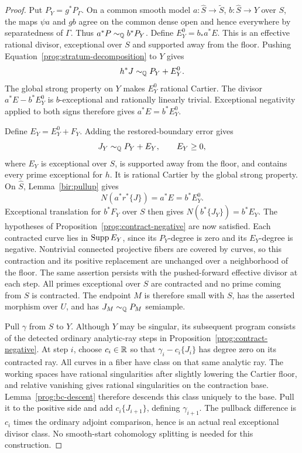 \begin{proof}
Put \(P_Y=g^*P_\Gamma\). On a common smooth model
\(a:\widehat S\to\widetilde S\), \(b:\widehat S\to Y\) over \(S\),
the maps \(\psi a\) and \(g b\) agree on the common dense open and hence
everywhere by separatedness of \(\Gamma\). Thus \(a^*P\sim_{\mathbb Q}b^*P_Y\).
Define \(E_Y^0=b_*a^*E\). This is an effective rational divisor,
exceptional over \(S\) and supported away from the floor. Pushing
Equation~\eqref{prog:stratum-decomposition} to \(Y\) gives
\[
 h^*J\sim_{\mathbb Q}P_Y+E_Y^0.
\]
The global strong property on \(Y\) makes \(E_Y^0\) rational Cartier.
The divisor \(a^*E-b^*E_Y^0\) is \(b\)-exceptional and
rationally linearly trivial. Exceptional negativity applied to both signs therefore
gives \(a^*E=b^*E_Y^0\).

Define \(E_Y=E_Y^0+F_Y\). Adding the restored-boundary error gives
\begin{equation}
 J_Y\sim_{\mathbb Q}P_Y+E_Y,\qquad E_Y\geq0,
 \label{prog:graph-adjoint}
\end{equation}
where \(E_Y\) is exceptional over \(S\), is supported away from the floor,
and contains every prime exceptional for \(h\). It is rational Cartier by
the global strong property. On \(\widehat S\), Lemma~\ref{bir:pullup}
gives
\[
 N(a^*r^*\{J\})=a^*E=b^*E_Y^0.
\]
Exceptional translation for \(b^*F_Y\) over \(S\) then gives
\(N(b^*\{J_Y\})=b^*E_Y\). The hypotheses of
Proposition~\ref{prog:contract-negative} are now satisfied.
Each contracted curve lies in \(\operatorname{Supp} E_Y\), since its
\(P_Y\)-degree is zero and its \(E_Y\)-degree is negative.
Nontrivial connected projective fibers are covered by curves,
so this contraction and its positive replacement are unchanged
over a neighborhood of the floor.  The same assertion persists
with the pushed-forward effective divisor at each step.
All primes exceptional over \(S\) are contracted and no prime
coming from \(S\) is contracted.  The endpoint \(M\) is
therefore small with \(S\), has the asserted morphism over
\(U\), and has \(J_M\sim_{\mathbb Q}P_M\) semiample.

Pull \(\gamma\) from \(S\) to \(Y\). Although \(Y\) may be singular,
its subsequent program consists of the detected ordinary analytic-ray
steps in Proposition~\ref{prog:contract-negative}. At step \(i\),
choose \(c_i\in\mathbb R\) so that
\(\gamma_i-c_i\{J_i\}\) has degree zero on its contracted ray.
All curves in a fiber have class on that same analytic ray. The
working spaces have rational singularities after slightly lowering
the Cartier floor, and relative vanishing gives rational singularities
on the contraction base. Lemma~\ref{prog:bc-descent} therefore
descends this class uniquely to the base. Pull it to the positive side
and add \(c_i\{J_{i+1}\}\), defining \(\gamma_{i+1}\).
The pullback difference is \(c_i\) times the ordinary adjoint
comparison, hence is an actual real exceptional divisor class.
No smooth-start cohomology splitting is needed for this construction.


\end{proof}

